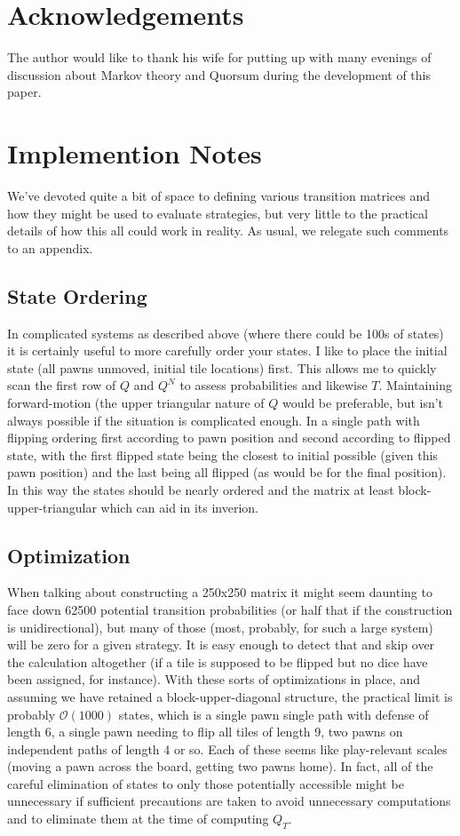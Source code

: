 \documentclass[letterpaper,11pt]{article}
\begin{document}
\section*{Acknowledgements}
The author would like to thank his wife for putting up with many evenings of
discussion about Markov theory and Quorsum during the development of this
paper.

\appendix
\section{Implemention Notes}
We've devoted quite a bit of space to defining various transition matrices and
how they might be used to evaluate strategies, but very little to the practical
details of how this all could work in reality.  As usual, we relegate such
comments to an appendix.

\subsection{State Ordering}
In complicated systems as described above (where there could be 100s of states)
it is certainly useful to more carefully order your states.  I like to place
the initial state (all pawns unmoved, initial tile locations) first.  This
allows me to quickly scan the first row of $Q$ and $Q^N$ to assess probabilities
and likewise $T$.  Maintaining forward-motion (the upper triangular nature of
$Q$ would be preferable, but isn't always possible if the situation is
complicated enough.  In a single path with flipping ordering first according
to pawn position and second according to flipped state, with the first flipped
state being the closest to initial possible (given this pawn position) and the
last being all flipped (as would be for the final position).  In this way the
states should be nearly ordered and the matrix at least block-upper-triangular
which can aid in its inverion.

\subsection{Optimization}
When talking about constructing a 250x250 matrix it might seem daunting to face
down 62500 potential transition probabilities (or half that if the construction
is unidirectional), but many of those (most, probably, for such a large system)
will be zero for a given strategy.  It is easy enough to detect that and skip
over the calculation altogether (if a tile is supposed to be flipped but no
dice have been assigned, for instance).  With these sorts of optimizations in
place, and assuming we have retained a block-upper-diagonal structure, the 
practical limit is probably $\mathcal{O}(1000)$ states, which is a single pawn
single path with defense of length 6, a single pawn needing to flip all tiles
of length 9, two pawns on independent paths of length 4 or so.  Each of these
seems like play-relevant scales (moving a pawn across the board, getting two
pawns home).  In fact, all of the careful elimination of states to only those
potentially accessible might be unnecessary if sufficient precautions are taken
to avoid unnecessary computations and to eliminate them at the time of computing
$Q_T$.  
\end{document}
